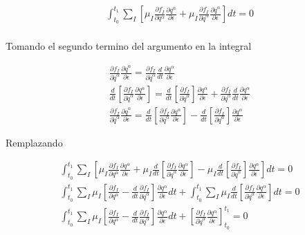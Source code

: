 \begin{gather*}
    \int_{t_0}^{t_1} \sum_I \left[\mu_I \frac{\partial f_I}{\partial q^{\alpha}}\frac{\partial q^{\alpha}}{\partial \epsilon} + \mu_I \frac{\partial f_I}{\partial \dot{q}^{\alpha}}\frac{\partial \dot{q}^{\alpha}}{\partial \epsilon} \right]dt = 0\\
\end{gather*}

Tomando el segundo termino del argumento en la integral

\begin{gather*}
    \frac{\partial f_I}{\partial \dot{q}^{\alpha}}\frac{\partial \dot{q}^{\alpha}}{\partial \epsilon} =  \frac{\partial f_I}{\partial \dot{q}^{\alpha}}\frac{d}{dt}\frac{\partial q^{\alpha}}{\partial \epsilon}\\
    \frac{d}{dt}\left[\frac{\partial f_I}{\partial \dot{q}^{\alpha}}\frac{\partial q^{\alpha}}{\partial \epsilon}\right] = \frac{d}{dt}\left[\frac{\partial f_I}{\partial \dot{q}^{\alpha}}\right]\frac{\partial q^{\alpha}}{\partial \epsilon} + \frac{\partial f_I}{\partial \dot{q}^{\alpha}}\frac{d}{dt}\frac{\partial q^{\alpha}}{\partial \epsilon}\\
    \frac{\partial f_I}{\partial \dot{q}^{\alpha}}\frac{\partial \dot{q}^{\alpha}}{\partial \epsilon} = \frac{d}{dt}\left[\frac{\partial f_I}{\partial \dot{q}^{\alpha}}\frac{\partial q^{\alpha}}{\partial \epsilon}\right] - \frac{d}{dt}\left[\frac{\partial f_I}{\partial \dot{q}^{\alpha}}\right]\frac{\partial q^{\alpha}}{\partial \epsilon}
\end{gather*}

Remplazando 

\begin{gather*}
    \int_{t_0}^{t_1} \sum_I \left[\mu_I \frac{\partial f_I}{\partial q^{\alpha}}\frac{\partial q^{\alpha}}{\partial \epsilon} + \mu_I \frac{d}{dt}\left[\frac{\partial f_I}{\partial \dot{q}^{\alpha}}\frac{\partial q^{\alpha}}{\partial \epsilon}\right] - \mu_I \frac{d}{dt}\left[\frac{\partial f_I}{\partial \dot{q}^{\alpha}}\right]\frac{\partial q^{\alpha}}{\partial \epsilon}  \right]dt = 0\\
    \int_{t_0}^{t_1} \sum_I \mu_I \left[\frac{\partial f_I}{\partial q^{\alpha}} - \frac{d}{dt}\frac{\partial f_I}{\partial \dot{q}^{\alpha}}\right]\frac{\partial q^{\alpha}}{\partial \epsilon}dt + \int_{t_0}^{t_1} \sum_I \mu_I  \frac{d}{dt}\left[\frac{\partial f_I}{\partial \dot{q}^{\alpha}}\frac{\partial q^{\alpha}}{\partial \epsilon}\right]dt = 0\\
    \int_{t_0}^{t_1} \sum_I \mu_I \left[\frac{\partial f_I}{\partial q^{\alpha}} - \frac{d}{dt}\frac{\partial f_I}{\partial \dot{q}^{\alpha}}\right]\frac{\partial q^{\alpha}}{\partial \epsilon}dt +   \left[\frac{\partial f_I}{\partial \dot{q}^{\alpha}}\frac{\partial q^{\alpha}}{\partial \epsilon}\right]_{t_0}^{t_1} = 0
\end{gather*}

